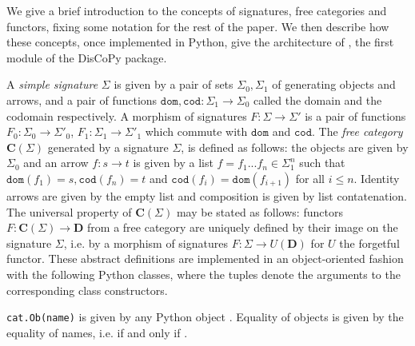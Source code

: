 
We give a brief introduction to the concepts of signatures, free categories
and functors, fixing some notation for the rest of the paper.
We then describe how these concepts, once implemented in Python, give the
architecture of , the first module of the DisCoPy package.

A \emph{simple signature} $\Sigma$ is given by a pair of sets $\Sigma_0, \Sigma_1$ of generating objects and arrows, and a pair of functions
$\mathtt{dom}, \mathtt{cod} : \Sigma_1 \to \Sigma_0$ called the domain and the codomain
respectively.
A morphism of signatures $F : \Sigma \to \Sigma'$ is a pair of functions
$F_0 : \Sigma_0 \to \Sigma'_0$, $F_1 : \Sigma_1 \to \Sigma'_1$ which commute with $\mathtt{dom}$ and $\mathtt{cod}$.
The \emph{free category} $\mathbf{C}(\Sigma)$ generated by a signature $\Sigma$, is
defined as follows: the objects are given by $\Sigma_0$ and an arrow
$f : s \to t$ is given by a list $f = f_1 ... f_n \in \Sigma_1^n$ such that
$\mathtt{dom}(f_1) = s, \mathtt{cod}(f_n) = t$ and $\mathtt{cod}(f_i) = \mathtt{dom}(f_{i + 1})$
for all $i \leq n$. Identity arrows are given by the empty list and composition
is given by list contatenation.
The universal property of $\mathbf{C}(\Sigma)$ may be stated as follows: functors
$F : \mathbf{C}(\Sigma) \to \mathbf{D}$ from a free category are uniquely defined by
their image on the signature $\Sigma$, i.e. by a morphism of signatures
$F : \Sigma \to U(\mathbf{D})$ for $U$ the forgetful functor.
These abstract definitions are implemented in an object-oriented fashion with
the following Python classes, where the tuples denote the arguments to the
corresponding class constructors.

\begin{class}\normalfont\texttt{cat.Ob(name)} is given by any Python object .
Equality of objects is given by the equality of names, i.e. 
if and only if .
\end{class}

